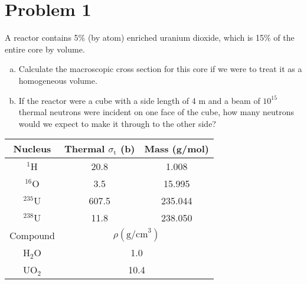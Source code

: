 \section*{Problem 1}

A reactor contains 5\% (by atom) enriched uranium dioxide, which is 15\% of the entire core by volume.
\begin{enumerate}[a)]
\item Calculate the macroscopic cross section for this core if we were to treat it as a homogeneous volume. 
\item If the reactor were a cube with a side length of 4 m and a beam of $10^{15}$ thermal neutrons were incident on one face of the cube, how many neutrons would we expect to make it through to the other side?
\end{enumerate}

\begin{table}[htbp]
	\centering
	\begin{tabular}{|c|c|c|}
			\hline
			Nucleus		& Thermal $\sigma_{\text{t}}$ (b) & Mass (g/mol) \\
			\hline
			$^{1}$H		&  20.8						& 1.008			\\
			$^{16}$O	&  3.5 						& 15.995		\\
			$^{235}$U	&  607.5 					& 235.044		\\
			$^{238}$U	&  11.8						& 238.050		\\
			\hline
			Compound	& \multicolumn{2}{|c|}{$\rho \left(\text{g/cm}^3\right)$}          \\
			\hline
			H$_2$O		& \multicolumn{2}{|c|}{1.0}      \\
			UO$_2$		& \multicolumn{2}{|c|}{10.4}	\\
			\hline
	\end{tabular}
	\label{tab:design-specs}
\end{table}


